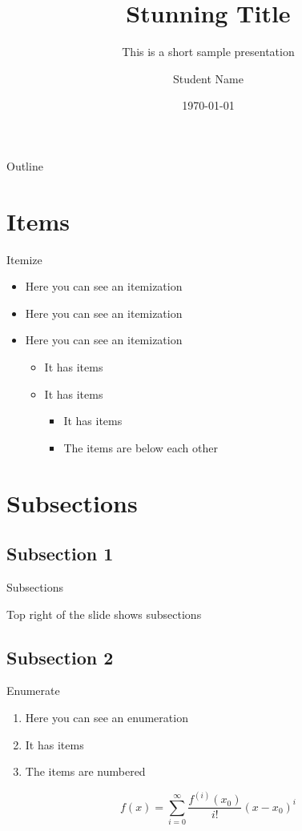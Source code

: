 \documentclass{beamer}
\author{Student Name}
\title{Stunning Title}
\subtitle{This is a short sample presentation}
\institute{Insitute of Computer Science \\ University of Innsbruck}
\date{\today}
\begin{document}
\begin{frame}
  \titlepage
\end{frame}

\begin{frame}{Outline}
	\tableofcontents
\end{frame}




\section{Items}
\begin{frame}{Itemize}
\begin{itemize}
\item Here you can see an itemization
\item Here you can see an itemization
\item Here you can see an itemization
\begin{itemize}
\item It has items
\item It has items
\begin{itemize}
\item It has items
\item The items are below each other
\end{itemize}
\end{itemize}
\end{itemize}
\end{frame}


\section{Subsections}
\subsection{Subsection 1}
\begin{frame}{Subsections}
\begin{center}
 {Top right of the slide shows subsections\huge }
\end{center}
\end{frame}


\subsection{Subsection 2}
\begin{frame}{Enumerate}
\begin{enumerate}
\item Here you can see an enumeration
\item It has items
\item The items are numbered
\end{enumerate}
\[
	f(x)=\sum_{i=0}^\infty \frac{f^{(i)}(x_0)}{i!}(x-x_0)^i
\]
\end{frame}
\end{document}
